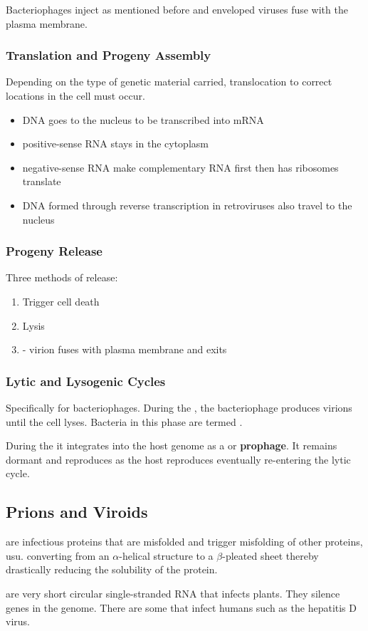 \documentclass[../Bio_chemistryReview.tex]{subfiles}
\begin{document}
Bacteriophages inject as mentioned before and enveloped viruses fuse with the
plasma membrane.

\subsubsection{Translation and Progeny Assembly\supdag}

Depending on the type of genetic material carried, translocation to correct
locations in the cell must occur.  \begin{itemize} \item DNA goes to the nucleus
    to be transcribed into mRNA \item positive-sense RNA stays in the cytoplasm
    \item negative-sense RNA make complementary RNA first then has ribosomes
      translate \item DNA formed through reverse transcription in retroviruses
        also travel to the nucleus \end{itemize}

\subsubsection{Progeny Release\supdag}

Three methods of release:

\begin{enumerate} \item Trigger cell death \item Lysis \item {}
      - virion fuses with plasma membrane and exits \end{enumerate}

\subsubsection{Lytic and Lysogenic Cycles\supdag}

Specifically for bacteriophages. During the , the
bacteriophage produces virions until the cell lyses. Bacteria in this phase are
termed .\par During the  it
integrates into the host genome as a  or \textbf{prophage}. It
remains dormant and reproduces as the host reproduces eventually re-entering the
lytic cycle.

\subsection{Prions and Viroids\supdag}

 are infectious proteins that are misfolded and trigger
misfolding of other proteins, usu. converting from an $ \alpha $-helical
structure to a $ \beta $-pleated sheet thereby drastically reducing the
solubility of the protein.\par {} are very short circular
single-stranded RNA that infects plants. They silence genes in the genome. There
are some that infect humans such as the hepatitis D virus.
\end{document}
